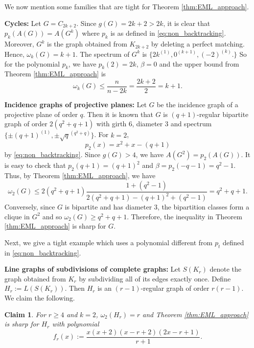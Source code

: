 \documentclass[10pt,a4paper]{article}
\theoremstyle{plain}
\newtheorem{claim}{Claim}[section]
\numberwithin{equation}{section}
\begin{document}
We now mention some families that are tight for Theorem \ref{thm:EML_approach}. 

\textbf{Cycles:} Let $G = C_{2k+2}$. Since $g(G)=2k+2>2k$, it is clear that $p_k(A(G)) = A(G^k)$ where $p_k$ is as defined in \eqref{eq:non_backtracking}. Moreover, $G^k$ is the graph obtained from $K_{2k+2}$ by deleting a perfect matching. Hence, $\omega_k(G) = k+1$. The spectrum of $G^k$ is $\{2k^{(1)}, 0^{(k+1)}, (-2)^{(k)}.\}$ So for the polynomial $p_k$, we have $p_k(2)=2k$, $\beta = 0$ and the upper bound from Theorem \ref{thm:EML_approach} is 
\[ \omega_k(G)\le \frac{n}{n-2k} = \frac{2k+2}{2} = k+1.\]

\textbf{Incidence graphs of projective planes:} Let $G$ be the incidence graph of a projective plane of order $q$. Then it is known that $G$ is $(q+1)$-regular bipartite graph of order $2(q^2+q+1)$ with girth $6$, diameter $3$ and spectrum $\{\pm  (q+1)^{(1)}, \pm \sqrt{q}^{(q^2+q)}\}$. For $k=2$, \[p_2(x) = x^2 + x - (q+1)\] 
by \eqref{eq:non_backtracking}. Since $g(G)>4$, we have $A(G^2) = p_2(A(G))$. It is easy to check that $p_2(q+1) = (q+1)^2$ and $\beta = p_2(-q-1)= q^2-1$. Thus, by Theorem \ref{thm:EML_approach}, we have 
\[ \omega_2(G)\le 2(q^2+q+1)\frac{1+(q^2-1)}{2(q^2+q+1) - (q+1)^2 + (q^2-1)}= q^2+q+1.\]
Conversely, since $G$ is bipartite and has diameter $3$, the bipartition classes form a clique in $G^2$ and so $\omega_2(G)\ge q^2+q+1$. Therefore, the inequality in Theorem \ref{thm:EML_approach} is sharp for $G$. 

Next, we give a tight example which uses a polynomial different from $p_t$ defined in \eqref{eq:non_backtracking}.

\textbf{Line graphs of subdivisions of complete graphs:} Let $S(K_r)$ denote the graph obtained from $K_r$ by subdividing all of its edges exactly once. Define $H_r:= L(S(K_r))$. Then $H_r$ is an $(r-1)$-regular graph of order $r(r-1)$. We claim the following.

\begin{claim}
For $r\ge 4$ and $k=2$, $\omega_2(H_r) = r$ and Theorem \ref{thm:EML_approach} is sharp for $H_r$ with polynomial 
\[ f_r(x) := \frac{x(x+2)(x-r+2)(2x-r+1)}{r+1}.\]
\end{claim}
\end{document}
